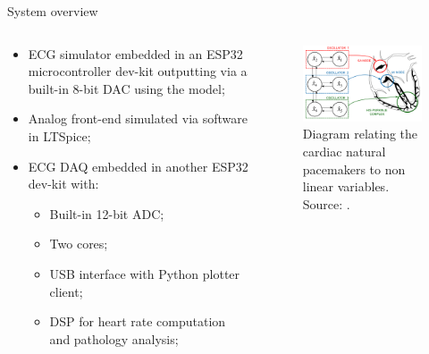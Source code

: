 \begin{frame}{System overview}

\begin{columns}[onlytextwidth]
    \begin{column}{0.5\textwidth}
    \begin{minipage}[c][0.5\textheight][c]{\linewidth}
        \begin{itemize}
            \item ECG simulator embedded in an ESP32 microcontroller dev-kit outputting via a built-in 8-bit DAC using the \cite{quiroz2019generation} model;
            \item Analog front-end simulated via software in LTSpice;
            \item ECG DAQ embedded in another ESP32 dev-kit with:
            \begin{itemize}
                \item Built-in 12-bit ADC;
                \item Two cores;
                \item USB interface with Python plotter client;
                \item DSP for heart rate computation and pathology analysis;
            \end{itemize}
        \end{itemize}

      \end{minipage}
      \end{column}
      
      \begin{column}{0.5\textwidth}
      \begin{minipage}[c][0.5\textheight][c]{\linewidth}
      \begin{figure}[H]
          \caption{Diagram relating the cardiac natural pacemakers to non linear variables. Source: \cite{quiroz2019generation}.}  \begin{center}
                \includegraphics[width=6cm]{images/oscillators.png}  
            \end{center}
            \label{fig:2} 
            \end{figure}
        \end{minipage}
      \end{column}
\end{columns}

\end{frame}